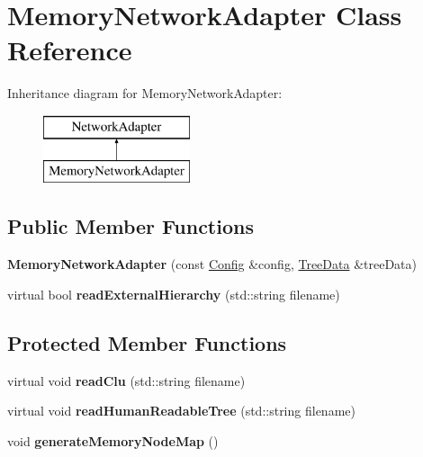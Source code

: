 \hypertarget{classMemoryNetworkAdapter}{}\section{Memory\+Network\+Adapter Class Reference}
\label{classMemoryNetworkAdapter}
Inheritance diagram for Memory\+Network\+Adapter\+:\begin{figure}[H]
\begin{center}
\leavevmode
\includegraphics[height=2.000000cm]{classMemoryNetworkAdapter}
\end{center}
\end{figure}
\subsection*{Public Member Functions}
\begin{DoxyCompactItemize}
\item 
\mbox{\label{classMemoryNetworkAdapter_a65365e58c3da2a552c33aa1216572efe}} 
{\bfseries Memory\+Network\+Adapter} (const \mbox{\hyperlink{structConfig}{Config}} \&config, \mbox{\hyperlink{classTreeData}{Tree\+Data}} \&tree\+Data)
\item 
\mbox{\label{classMemoryNetworkAdapter_a87d9bb922849f65f399b4c7c63bd6ba4}} 
virtual bool {\bfseries read\+External\+Hierarchy} (std\+::string filename)
\end{DoxyCompactItemize}
\subsection*{Protected Member Functions}
\begin{DoxyCompactItemize}
\item 
\mbox{\label{classMemoryNetworkAdapter_aa9a9c5fa08ba3a71fec058b6248ea1d5}} 
virtual void {\bfseries read\+Clu} (std\+::string filename)
\item 
\mbox{\label{classMemoryNetworkAdapter_a462ea893cb3b0a797f9d43786305e7c7}} 
virtual void {\bfseries read\+Human\+Readable\+Tree} (std\+::string filename)
\item 
\mbox{\label{classMemoryNetworkAdapter_a327d981ec91e9ffd8a49ccd2586aa88e}} 
void {\bfseries generate\+Memory\+Node\+Map} ()
\end{DoxyCompactItemize}
